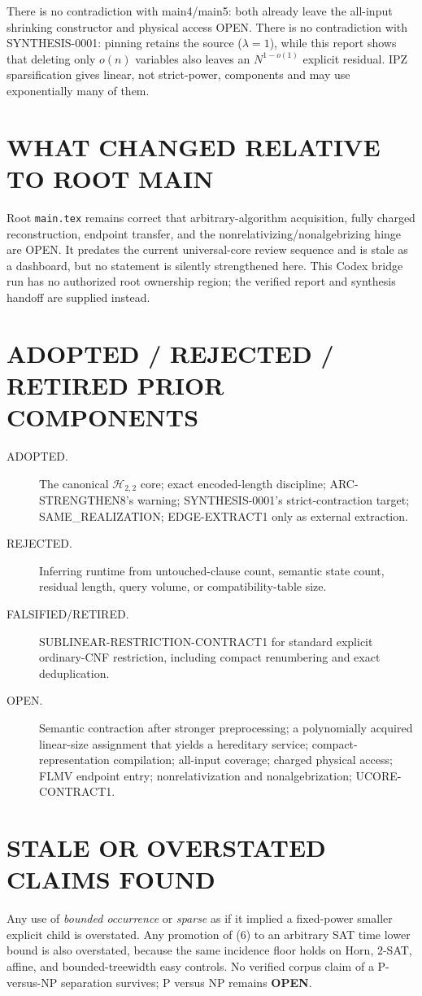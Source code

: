 \documentclass[11pt]{article}
\begin{document}
There is no contradiction with main4/main5: both already leave the all-input
shrinking constructor and physical access OPEN.  There is no contradiction
with SYNTHESIS-0001: pinning retains the source ($\lambda=1$), while this
report shows that deleting only $o(n)$ variables also leaves an
$N^{1-o(1)}$ explicit residual.  IPZ sparsification gives linear, not
strict-power, components and may use exponentially many of them.

\section{WHAT CHANGED RELATIVE TO ROOT MAIN}
Root \texttt{main.tex} remains correct that arbitrary-algorithm acquisition,
fully charged reconstruction, endpoint transfer, and the
nonrelativizing/nonalgebrizing hinge are OPEN.  It predates the current
universal-core review sequence and is stale as a dashboard, but no statement
is silently strengthened here.  This Codex bridge run has no authorized root
ownership region; the verified report and synthesis handoff are supplied
instead.

\section{ADOPTED / REJECTED / RETIRED PRIOR COMPONENTS}
\begin{description}
\item[ADOPTED.] The canonical $\mathcal H_{2,2}$ core; exact encoded-length
discipline; ARC-STRENGTHEN8's warning; SYNTHESIS-0001's strict-contraction
target; SAME\_REALIZATION; EDGE-EXTRACT1 only as external extraction.
\item[REJECTED.] Inferring runtime from untouched-clause count, semantic
state count, residual length, query volume, or compatibility-table size.
\item[FALSIFIED/RETIRED.] \textsf{SUBLINEAR-RESTRICTION-CONTRACT1} for
standard explicit ordinary-CNF restriction, including compact renumbering
and exact deduplication.
\item[OPEN.] Semantic contraction after stronger preprocessing; a
polynomially acquired linear-size assignment that yields a hereditary
service; compact-representation compilation; all-input coverage; charged
physical access; FLMV endpoint entry; nonrelativization and
nonalgebrization; \textsf{UCORE-CONTRACT1}.
\end{description}

\section{STALE OR OVERSTATED CLAIMS FOUND}
Any use of \emph{bounded occurrence} or \emph{sparse} as if it implied a
fixed-power smaller explicit child is overstated.  Any promotion of (6) to
an arbitrary SAT time lower bound is also overstated, because the same
incidence floor holds on Horn, $2$-SAT, affine, and bounded-treewidth easy
controls.  No verified corpus claim of a P-versus-NP separation survives;
P versus NP remains \textbf{OPEN}.
\end{document}
